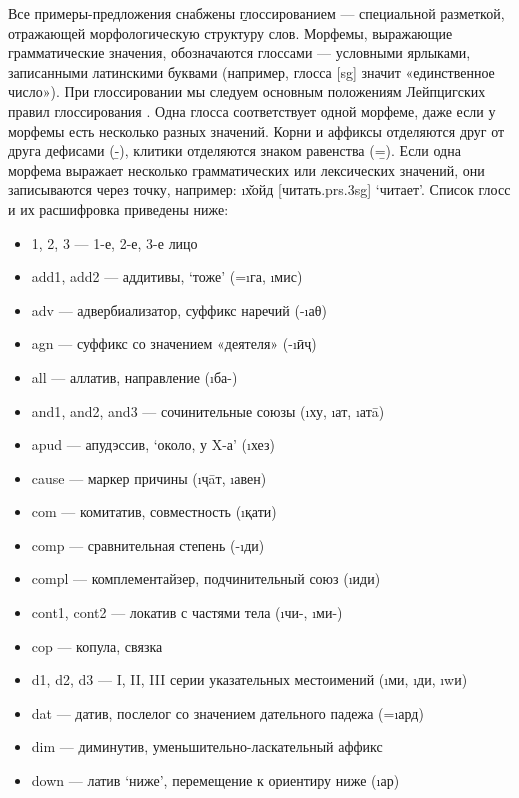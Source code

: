Все примеры-предложения снабжены \b{глоссированием} — специальной разметкой, отражающей морфологическую структуру слов. Морфемы, выражающие грамматические значения, обозначаются глоссами — условными ярлыками, записанными латинскими буквами (например, глосса [{\sc sg}] значит «единственное число»). При глоссировании мы следуем основным положениям Лейпцигских правил глоссирования \parencite{leipzig}. Одна глосса соответствует одной морфеме, даже если у морфемы есть несколько разных значений. Корни и аффиксы отделяются друг от друга дефисами (\b{-}), клитики отделяются знаком равенства (\b{=}). Если одна морфема выражает несколько грамматических или лексических значений, они записываются через точку, например: \i{х̌ойд} [читать.{\sc prs.3sg}] ‘читает’. Список глосс и их расшифровка приведены ниже:

{\small
\begin{itemize}
  \item 1, 2, 3 — 1-е, 2-е, 3-е лицо
  \item {\sc add1}, {\sc add2} — аддитивы, ‘тоже’ (=\i{га}, \i{мис})
  \item {\sc adv} — адвербиализатор, суффикс наречий (-\i{аθ})
  \item {\sc agn} — суффикс со значением «деятеля» (-\i{ӣҷ})
  \item {\sc all} — аллатив, направление (\i{ба}-)
  \item {\sc and1}, {\sc and2}, {\sc and3} — сочинительные союзы (\i{ху}, \i{ат}, \i{атā})
  \item {\sc apud} — апудэссив, ‘около, у X-а’ (\i{хез})
  \item {\sc cause} — маркер причины (\i{ҷāт}, \i{авен})
  \item {\sc com} — комитатив, совместность (\i{қати})
  \item {\sc comp} — сравнительная степень (-\i{ди})
  \item {\sc compl} — комплементайзер, подчинительный союз (\i{иди})
  \item {\sc cont1}, {\sc cont2} — локатив с частями тела (\i{чи}-, \i{ми}-)
  \item {\sc cop} — копула, связка
  \item {\sc d1}, {\sc d2}, {\sc d3} — I, II, III серии указательных местоимений (\i{ми}, \i{ди}, \i{wи})
  \item {\sc dat} — датив, послелог со значением дательного падежа (=\i{ард})
  \item {\sc dim} — диминутив, уменьшительно-ласкательный аффикс
  \item {\sc down} — латив ‘ниже’, перемещение к ориентиру ниже (\i{ар})

\end{itemize}}
